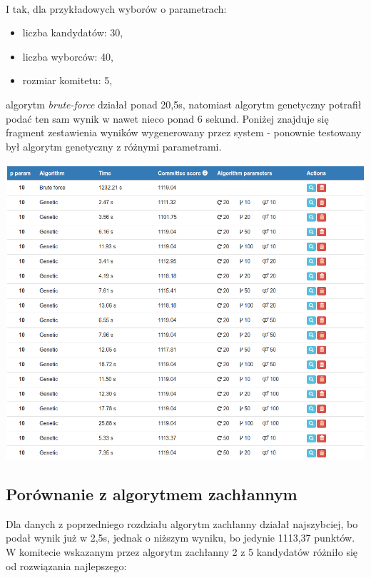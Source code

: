 \documentclass[pdflatex,11pt]{../aghdoc_version2}
\begin{document}
~\\
I tak, dla przykładowych wyborów o parametrach:
\begin{itemize}
\item liczba kandydatów: 30,
\item liczba wyborców: 40,
\item rozmiar komitetu: 5,
\end{itemize}
algorytm \textit{brute-force} działał ponad 20,5s, natomiast algorytm genetyczny potrafił podać ten sam wynik w nawet nieco ponad 6 sekund. Poniżej znajduje się fragment zestawienia wyników wygenerowany przez system - ponownie testowany był algorytm genetyczny z różnymi parametrami.

\includegraphics[width=\textwidth]{pics/porownanie-gen-brut.png}


\subsection{Porównanie z algorytmem zachłannym}
Dla danych z poprzedniego rozdziału algorytm zachłanny działał najszybciej, bo podał wynik już w 2,5s, jednak o niższym wyniku, bo jedynie 1113,37 punktów. W komitecie wskazanym przez algorytm zachłanny 2 z 5 kandydatów różniło się od rozwiązania najlepszego:
\end{document}
